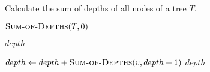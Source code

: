 
\begin{algorithm}[H]
  \caption{Calculate the sum of depths of all nodes of a tree $T$.}
  \label{alg:sum-of-depths}
  \begin{algorithmic}[1]
      \State \Return $\Call{Sum-of-Depths}{T, 0}$ 
    \EndProcedure

    \Statex
     
        \State \Return $depth$
      \EndIf

      \Statex
	\State $depth \gets depth + \Call{Sum-of-Depths}{v, depth + 1}$
      \EndFor
      \State \Return $depth$
    \EndProcedure
  \end{algorithmic}
\end{algorithm}
